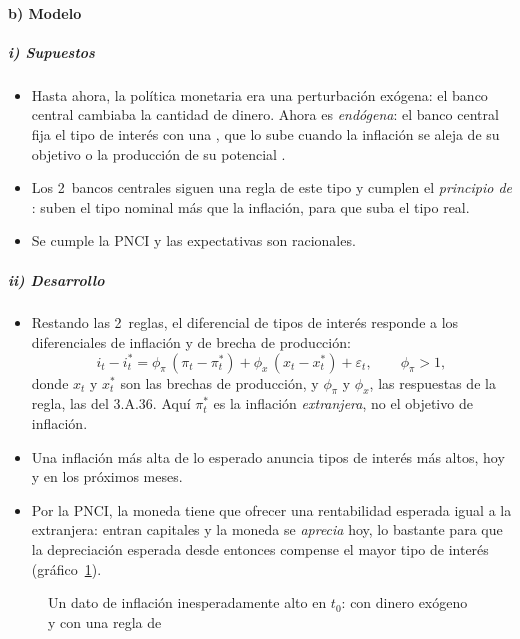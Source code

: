 \documentclass[11pt]{article}
\begin{document}
\paragraph{b) Modelo}
\subparagraph{i) Supuestos}
\begin{itemize}
\item Hasta ahora, la política monetaria era una perturbación exógena: el banco central cambiaba la cantidad de dinero. Ahora es \emph{endógena}: el banco central fija el tipo de interés con una , que lo sube cuando la inflación se aleja de su objetivo o la producción de su potencial .
\item Los 2~bancos centrales siguen una regla de este tipo y cumplen el \emph{principio de }: suben el tipo nominal más que la inflación, para que suba el tipo real.
\item Se cumple la PNCI y las expectativas son racionales.
\end{itemize}

\subparagraph{ii) Desarrollo}
\begin{itemize}
\item Restando las 2~reglas, el diferencial de tipos de interés responde a los diferenciales de inflación y de brecha de producción\nocite{EngelWest2006Taylor,MolodtsovaPapell2009}:
  \begin{equation}\label{eq:taylor-tc}
  i_t-i^{*}_t=\phi_\pi\,(\pi_t-\pi^{*}_t)+\phi_x\,(x_t-x^{*}_t)+\varepsilon_t,\qquad \phi_\pi>1 ,
  \end{equation}
  donde $x_t$ y $x^*_t$ son las brechas de producción, y $\phi_\pi$ y $\phi_x$, las respuestas de la regla, las del 3.A.36. Aquí $\pi^*_t$ es la inflación \emph{extranjera}, no el objetivo de inflación.
\item Una inflación más alta de lo esperado anuncia tipos de interés más altos, hoy y en los próximos meses.
\item Por la PNCI, la moneda tiene que ofrecer una rentabilidad esperada igual a la extranjera: entran capitales y la moneda se \emph{aprecia} hoy, lo bastante para que la depreciación esperada desde entonces compense el mayor tipo de interés (gráfico~\ref{fig:paradoja-apreciacion}).
\end{itemize}

\begin{figure}[H]
\centering
\caption{Un dato de inflación inesperadamente alto en $t_0$: con dinero exógeno y con una regla de }\label{fig:paradoja-apreciacion}
\end{figure}
\end{document}
